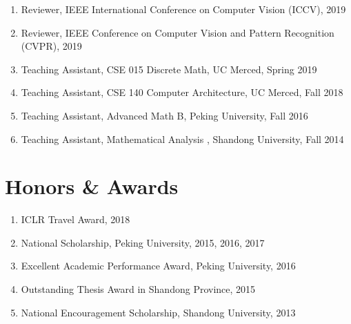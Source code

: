 \documentclass[letterpaper]{article}
\def\footerlink{http://jblevins.org/projects/cv-template/}
\begin{document}
\begin{enumerate}

\item Reviewer, IEEE International Conference on Computer Vision (ICCV), 2019

\item Reviewer, IEEE Conference on Computer Vision and Pattern Recognition (CVPR), 2019 

\item Teaching Assistant, CSE 015 Discrete Math, UC Merced, Spring 2019

\item Teaching Assistant, CSE 140 Computer Architecture, UC Merced, Fall 2018

\item Teaching Assistant, Advanced Math B, Peking University, Fall 2016

\item Teaching Assistant, Mathematical Analysis \uppercase\expandafter{}, Shandong University, Fall 2014

\end{enumerate}


\section*{Honors \& Awards}

\begin{enumerate}

\item ICLR Travel Award, 2018

\item National Scholarship, Peking University, 2015, 2016, 2017

\item Excellent Academic Performance Award, Peking University, 2016

\item Outstanding Thesis Award in Shandong Province, 2015

\item National Encouragement Scholarship, Shandong University, 2013

\end{enumerate}


\bigskip

\end{document}
